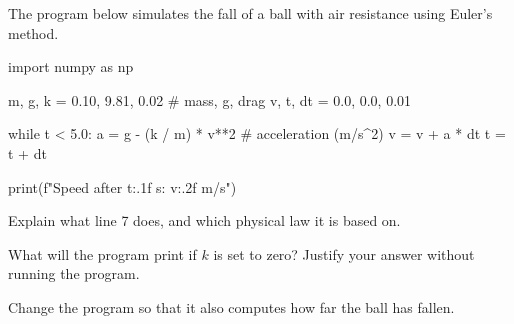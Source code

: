 \documentclass[12pt]{article}
\begin{document}
\begin{exercise}
The program below simulates the fall of a ball with air resistance using Euler's method.

\begin{python}
import numpy as np

m, g, k = 0.10, 9.81, 0.02     # mass, g, drag
v, t, dt = 0.0, 0.0, 0.01

while t < 5.0:
    a = g - (k / m) * v**2      # acceleration (m/s^2)
    v = v + a * dt
    t = t + dt

print(f"Speed after {t:.1f} s: {v:.2f} m/s")
\end{python}

\begin{subproblems}
  \item Explain what line 7 does, and which physical law it is based on.
  \item What will the program print if $k$ is set to zero? Justify your answer without running the program.
  \item Change the program so that it also computes how far the ball has fallen.
\end{subproblems}
\end{exercise}
\end{document}

